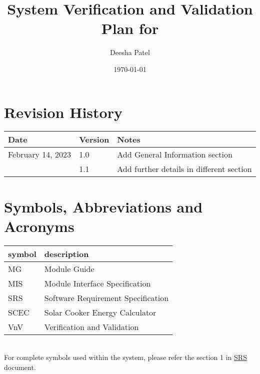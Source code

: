 \documentclass[12pt, titlepage]{article}
\begin{document}
\title{System Verification and Validation Plan for } 
\author{Deesha Patel}
\date{\today}
	
\maketitle


\section{Revision History}

\begin{tabularx}{\textwidth}{p{5cm}p{1.5cm}X}
\toprule {\bf Date} & {\bf Version} & {\bf Notes}\\
\midrule
February 14, 2023 & 1.0 & Add General Information section \\
& 1.1 & Add further details in different section \\

\bottomrule
\end{tabularx}

\newpage

\tableofcontents

\listoftables

\listoffigures
{}

\newpage

\section{Symbols, Abbreviations and Acronyms}

\renewcommand{\arraystretch}{1.2}
\begin{tabular}{l l} 
  \toprule		
  \textbf{symbol} & \textbf{description}\\
  \midrule 
  MG & Module Guide \\
  MIS & Module Interface Specification \\
  SRS & Software Requirement Specification\\
  SCEC & Solar Cooker Energy Calculator \\ 
  VnV & Verification and Validation \\ 
  
  \bottomrule
\end{tabular}\\

For complete symbols used within the system, please refer the section 1 in 
  \href{https://github.com/DeeshaPatel/CAS-741-Solar-Cooker/blob/7c53c8d9a19ca2f94dfba6ba9208eae0bf03b8cc/docs/SRS/SRS.pdf}{SRS} document.
\end{document}
